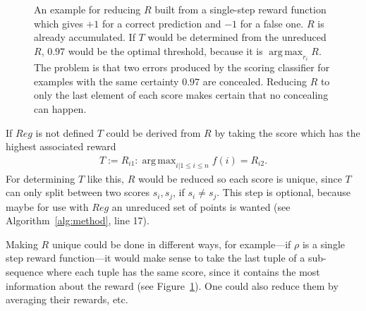 \documentclass[twoside,11pt]{article}
\DeclareMathOperator*{\argmax}{arg\,max}
\begin{document}
\begin{figure}
  \begin{center}
  \end{center}
  \caption{An example for reducing $R$ built from a
           single-step reward function which gives $+1$ for
           a correct prediction and $-1$ for a false one.
           $R$ is already accumulated.
           If $T$ would be determined from the unreduced
           $R$, $0.97$ would be the optimal threshold,
           because it is $\argmax_{r_i} R$. The problem is
           that two errors produced by the scoring
           classifier for examples with the same
           certainty $0.97$ are concealed. Reducing $R$
           to only the last element of each score makes
           certain that no concealing can happen.}
  \label{fig:reduce}
\end{figure}

If $Reg$ is not defined $T$ could be derived from $R$
by taking the score which has the highest associated
reward
\begin{align}
  \label{eq:T_R}
  T := R_{i1}: \argmax_{i|1 \leq i \leq n} f(i) = R_{i2}.
\end{align}
For determining $T$ like this, $R$ would be reduced so each
score is unique, since $T$ can only split between two
scores $s_i, s_j$, if $s_i \neq s_j$.
This step is optional, because maybe for use with $Reg$ an
unreduced set of points is wanted
(see Algorithm~\ref{alg:method}, line 17).

Making $R$ unique could be done in different ways, for
example---if $\rho$ is a single step reward function---it
would make sense to take the last tuple of a sub-sequence
where each tuple has the same score, since it contains the
most information about the reward
(see Figure~\ref{fig:reduce}).
One could also reduce them by averaging their rewards, etc.
\end{document}
